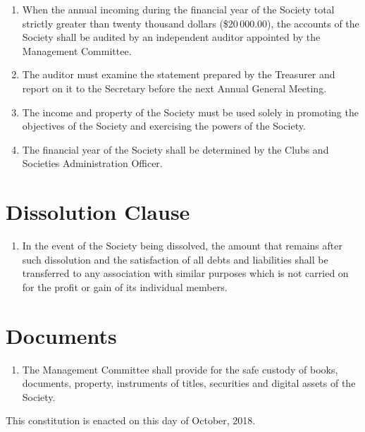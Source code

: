 \documentclass[a4paper]{article}
\begin{document}
\begin{enumerate}
\item When the annual incoming during the financial year of the Society total strictly greater than twenty thousand dollars (\$20\,000.00), the accounts of the Society shall be audited by an independent auditor appointed by the Management Committee.
\item The auditor must examine the statement prepared by the Treasurer and report on it to the Secretary before the next Annual General Meeting.
\item The income and property of the Society must be used solely in promoting the objectives of the Society and exercising the powers of the Society.
\item The financial year of the Society shall be determined by the Clubs and Societies Administration Officer.
\end{enumerate}

\section{Dissolution Clause}
\begin{enumerate}
\item In the event of the Society being dissolved, the amount  that remains after such dissolution and the satisfaction of all debts and liabilities shall be transferred to any association with similar purposes which is not carried on for the profit or gain of its individual members.
\end{enumerate}

\section{Documents}
\begin{enumerate}
\item The Management Committee shall provide for the safe custody of books, documents, property, instruments of titles, securities and digital assets of the Society.
\end{enumerate}

\vspace{\fill}
This constitution is enacted on this  day of October, 2018.
\end{document}
